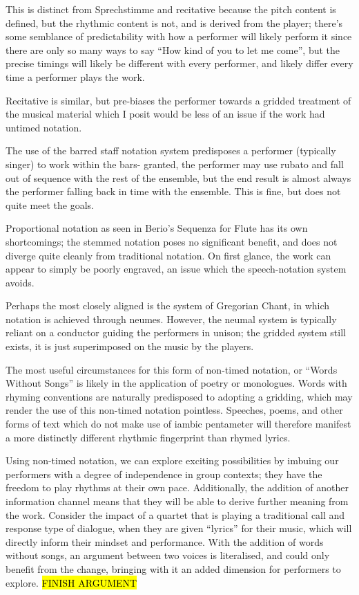 This is distinct from Sprechstimme and recitative because the pitch content is defined, but the rhythmic content is not, and is derived from the player; 
there's some semblance of predictability with how a performer will likely perform it since there are only so many ways to say ``How kind of you to let me come'', but the precise timings will likely be different with every performer, and likely differ every time a performer plays the work. 

Recitative is similar, but pre-biases the performer towards a gridded treatment of the musical material which I posit would be less of an issue if the work had untimed notation. 

The use of the barred staff notation system predisposes a performer (typically singer) to work within the bars- granted, the performer may use rubato and fall out of sequence with the rest of the ensemble, but the end result is almost always the performer falling back in time with the ensemble. 
This is fine, but does not quite meet the goals.

Proportional notation as seen in Berio's Sequenza for Flute has its own shortcomings; the stemmed notation poses no significant benefit, and does not diverge quite cleanly from traditional notation. 
On first glance, the work can appear to simply be poorly engraved, an issue which the speech-notation system avoids.

Perhaps the most closely aligned is the system of Gregorian Chant, in which notation is achieved through neumes. 
However, the neumal system is typically reliant on a conductor guiding the performers in unison; the gridded system still exists, it is just superimposed on the music by the players.

The most useful circumstances for this form of non-timed notation, or ``Words Without Songs'' is likely in the application of poetry or monologues. 
Words with rhyming conventions are naturally predisposed to adopting a gridding, which may render the use of this non-timed notation pointless. 
Speeches, poems, and other forms of text which do not make use of iambic pentameter will therefore manifest a more distinctly different rhythmic fingerprint than rhymed lyrics. 

Using non-timed notation, we can explore exciting possibilities by imbuing our performers with a degree of independence in group contexts; 
they have the freedom to play rhythms at their own pace. 
Additionally, the addition of another information channel means that they will be able to derive further meaning from the work. 
Consider the impact of a quartet that is playing a traditional call and response type of dialogue, when they are given ``lyrics'' for their music, which will directly inform their mindset and performance. 
With the addition of words without songs, an argument between two voices is literalised, and could only benefit from the change, bringing with it an added dimension for performers to explore. \hl{FINISH ARGUMENT}